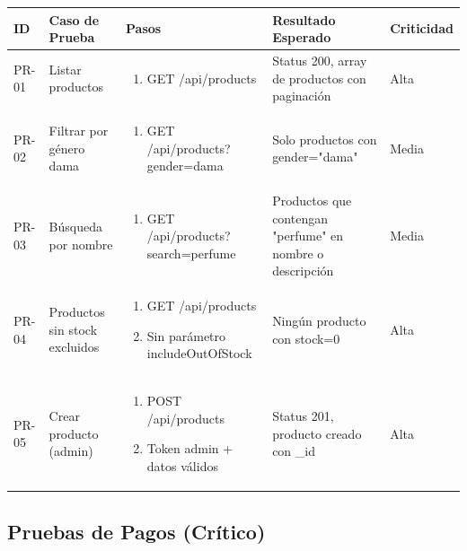 \documentclass[12pt,a4paper]{article}
\begin{document}
\begin{longtable}{|p{1cm}|p{3cm}|p{4cm}|p{3cm}|p{3cm}|}
\hline
\textbf{ID} & \textbf{Caso de Prueba} & \textbf{Pasos} & \textbf{Resultado Esperado} & \textbf{Criticidad} \\
\hline
\endfirsthead
PR-01 & Listar productos &
\begin{enumerate}[leftmargin=*,nosep]
    \item GET /api/products
\end{enumerate} &
Status 200, array de productos con paginación & Alta \\
\hline
PR-02 & Filtrar por género dama &
\begin{enumerate}[leftmargin=*,nosep]
    \item GET /api/products?gender=dama
\end{enumerate} &
Solo productos con gender="dama" & Media \\
\hline
PR-03 & Búsqueda por nombre &
\begin{enumerate}[leftmargin=*,nosep]
    \item GET /api/products?search=perfume
\end{enumerate} &
Productos que contengan "perfume" en nombre o descripción & Media \\
\hline
PR-04 & Productos sin stock excluidos &
\begin{enumerate}[leftmargin=*,nosep]
    \item GET /api/products
    \item Sin parámetro includeOutOfStock
\end{enumerate} &
Ningún producto con stock=0 & Alta \\
\hline
PR-05 & Crear producto (admin) &
\begin{enumerate}[leftmargin=*,nosep]
    \item POST /api/products
    \item Token admin + datos válidos
\end{enumerate} &
Status 201, producto creado con \_id & Alta \\
\hline
\end{longtable}

\subsection{Pruebas de Pagos (Crítico)}
\end{document}
